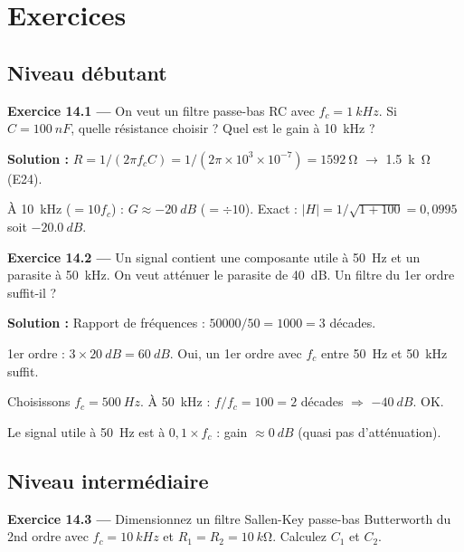 \documentclass[12pt,a4paper,twoside]{book}
\begin{document}
\section*{Exercices}

\subsection*{Niveau débutant}

\textbf{Exercice 14.1 ---} On veut un filtre passe-bas RC avec $f_c = \SI{1}{kHz}$. Si $C = \SI{100}{nF}$, quelle résistance choisir ? Quel est le gain à \SI{10}{kHz} ?

\begin{pratique}
\textbf{Solution :} $R = 1/(2\pi f_c C) = 1/(2\pi\times10^3\times10^{-7}) = \SI{1592}{\ohm}$ $\to$ \SI{1.5}{k\ohm} (E24).

À \SI{10}{kHz} ($= 10f_c$) : $G \approx -\SI{20}{dB}$ ($= \div 10$). Exact : $|H| = 1/\sqrt{1+100} = 0{,}0995$ soit $\SI{-20.0}{dB}$.
\end{pratique}

\textbf{Exercice 14.2 ---} Un signal contient une composante utile à \SI{50}{Hz} et un parasite à \SI{50}{kHz}. On veut atténuer le parasite de \SI{40}{dB}. Un filtre du 1er ordre suffit-il ?

\begin{pratique}
\textbf{Solution :} Rapport de fréquences : $50000/50 = 1000 = 3$ décades.

1er ordre : $3 \times \SI{20}{dB} = \SI{60}{dB}$. Oui, un 1er ordre avec $f_c$ entre \SI{50}{Hz} et \SI{50}{kHz} suffit.

Choisissons $f_c = \SI{500}{Hz}$. À \SI{50}{kHz} : $f/f_c = 100 = 2$ décades $\Rightarrow$ $\SI{-40}{dB}$. OK.

Le signal utile à \SI{50}{Hz} est à $0{,}1 \times f_c$ : gain $\approx \SI{0}{dB}$ (quasi pas d'atténuation). \checkmark
\end{pratique}

\subsection*{Niveau intermédiaire}

\textbf{Exercice 14.3 ---} Dimensionnez un filtre Sallen-Key passe-bas Butterworth du 2nd ordre avec $f_c = \SI{10}{kHz}$ et $R_1 = R_2 = \SI{10}{k\ohm}$. Calculez $C_1$ et $C_2$.
\end{document}
